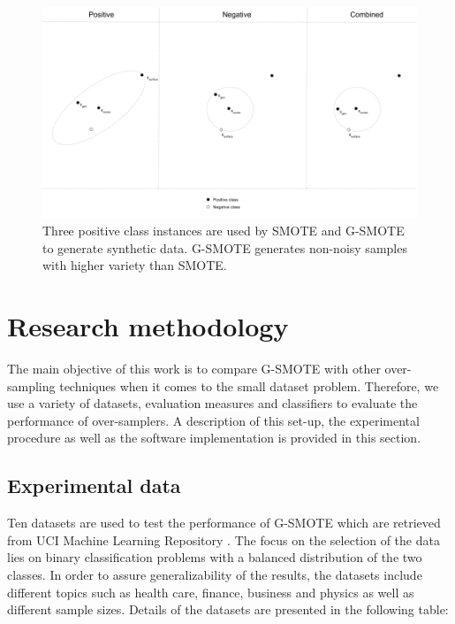 \documentclass[parskip=full]{scrartcl}
\begin{document}
\begin{figure}[H]
	\centering
	\includegraphics[width=1\linewidth]{../analysis/smote_mechanism.png}
	\caption{Three positive class instances are used by SMOTE and G-SMOTE 
	to generate synthetic data. G-SMOTE generates non-noisy samples 
	with higher variety than SMOTE.}
	\label{fig:gsmotemechanism}
\end{figure}

\section{Research methodology}

The main objective of this work is to compare G-SMOTE with other over-sampling
techniques when it comes to the small dataset problem. Therefore, we use a
variety of datasets, evaluation measures and classifiers to evaluate the
performance of over-samplers. A description of this set-up, the experimental
procedure as well as the software implementation is provided in this section.

\subsection{Experimental data}

Ten datasets are used to test the performance of G-SMOTE which are retrieved
from UCI Machine Learning Repository \cite{Dua.2019}. The focus on the selection
of the data lies on binary classification problems with a balanced distribution
of the two classes. In order to assure generalizability of the results, the
datasets include different topics such as health care, finance, business and
physics as well as different sample sizes. Details of the datasets are presented
in the following table:
\end{document}
